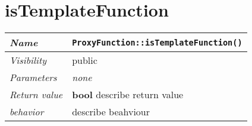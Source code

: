  \section{isTemplateFunction}
\begin{longtable}{p{3cm} @{\hskip 1cm} p{12cm}}
 \hline
\textit{Name} & \texttt{ProxyFunction::isTemplateFunction()}\\
\hline
 \textit{Visibility} & public\\
\hline
\textit{Parameters} & \textit{none}\\
\hline
\textit{Return value} & \textbf{ bool} describe return value\\
  \hline
 \textit{behavior} & describe beahviour \\
\hline
\end{longtable} \pagebreak
 